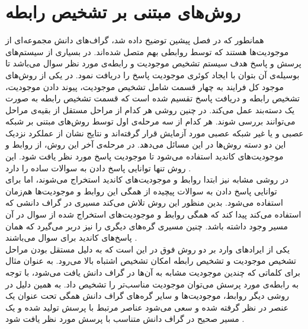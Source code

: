 \section{روش‌های مبتنی بر تشخیص رابطه}
همانطور که در فصل پیشین توضیح داده شد، گراف‌های دانش مجموعه‌ای از موجودیت‌ها هستند که توسط روابطی بهم متصل شده‌اند. در بسیاری از سیستم‌های پرسش و پاسخ هدف سیستم تشخیص موجودیت و رابطه‌ی مورد نظر سوال می‌باشد تا بوسیله‌ی آن بتوان با ایجاد کوئری موجودیت پاسخ را دریافت نمود. در یکی از روش‌های موجود کل فرایند به چهار قسمت شامل تشخیص موجودیت، پیوند دادن موجودیت، تشخیص رابطه و دریافت پاسخ تقسیم شده است که قسمت تشخیص رابطه به صورت یک دسته‌بند عمل می‌کند. در چنین روشی هر کدام از مراحل مستقل از بقیه‌ی مراحل می‌توانند بررسی شوند. هر کدام از سه مرحله‌ی اول توسط روش‌های مبتنی بر شبکه عصبی و یا غیر شبکه عصبی مورد آزمایش قرار گرفته‌اند و نتایج نشان از عملکرد نزدیک این دو دسته روش‌ها در این مسائل می‌دهد. در مرحله‌ی آخر این روش، از روابط و موجودیت‌های کاندید استفاده می‌شود تا موجودیت پاسخ مورد نظر یافت شود. این روش تنها توانایی پاسخ دادن به سوالات ساده را دارد \cite{mohammed2018strongbaseline}.\\
در روشی مشابه نیز ابتدا روابط و موجودیت‌های کاندید استخراج می‌شوند، اما برای توانایی پاسخ دادن به سوالات پیچیده از همگی این روابط و موجودیت‌ها هم‌زمان استفاده می‌شود. بدین منظور این روش تلاش می‌کند مسیری در گراف دانشی که استفاده می‌کند پیدا کند که همگی روابط و موجودیت‌های استخراج شده از سوال در آن مسیر وجود داشته باشد. چنین مسیری گره‌های دیگری را نیز دربر می‌گیرد که همان پاسخ‌های کاندید برای سوال می‌باشند \cite{zafar2018formalquery}.\\
یکی از ایراد‌های وارد بر دو روش فوق در این است که به دلیل مستقل بودن مراحل تشخیص موجودیت و تشخیص رابطه امکان تشخیص اشتباه بالا می‌رود. به عنوان مثال برای کلماتی که چندین موجودیت مشابه به آن‌ها در گراف دانش یافت می‌شود، با توجه به رابطه‌ی مورد پرسش می‌توان موجودیت مناسب‌تر را تشخیص داد. به همین دلیل در روشی دیگر روابط، موجودیت‌ها و سایر گره‌های گراف دانش همگی تحت عنوان یک عنصر در نظر گرفته شده و سعی می‌شود عناصر مرتبط با پرسش تولید شده و یک مسیر صحیح در گراف دانش متناسب با پرسش مورد نظر یافت شود \cite{lan2019kbtopic}.
